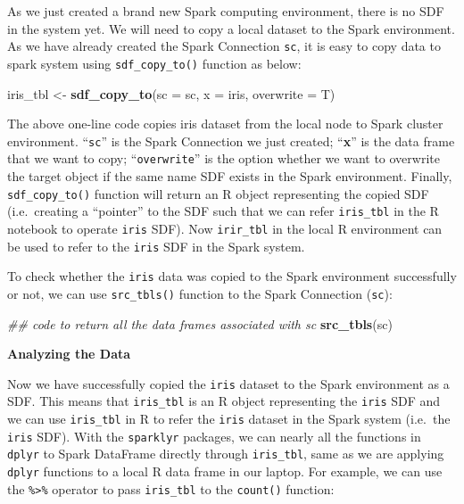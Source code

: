 \documentclass[12pt,]{krantz}
\makeatletter
\newenvironment{Shaded}{\begin{snugshade}}{\end{snugshade}}
\newcommand{\CommentTok}[1]{\textcolor[rgb]{0.37,0.37,0.37}{\textit{#1}}}
\newcommand{\DataTypeTok}[1]{\textcolor[rgb]{0.27,0.27,0.27}{#1}}
\newcommand{\KeywordTok}[1]{\textcolor[rgb]{0.27,0.27,0.27}{\textbf{#1}}}
\newcommand{\NormalTok}[1]{#1}
\newcommand{\StringTok}[1]{\textcolor[rgb]{0.5,0.5,0.5}{#1}}
\newenvironment{kframe}{%
\medskip{}
\setlength{\fboxsep}{.8em}
 \def\at@end@of@kframe{}%
 \ifinner\ifhmode%
  \def\at@end@of@kframe{\end{minipage}}%
  \begin{minipage}{\columnwidth}%
 \fi\fi%
 \def\FrameCommand##1{\hskip\@totalleftmargin \hskip-\fboxsep
 \colorbox{shadecolor}{##1}\hskip-\fboxsep
     \hskip-\linewidth \hskip-\@totalleftmargin \hskip\columnwidth}%
 \MakeFramed {\advance\hsize-\width
   \@totalleftmargin\z@ \linewidth\hsize
   \@setminipage}}%
 {\par\unskip\endMakeFramed%
 \at@end@of@kframe}
\renewenvironment{Shaded}{\begin{kframe}}{\end{kframe}}
\makeatother
\begin{document}
As we just created a brand new Spark computing environment, there is no SDF in the system yet. We will need to copy a local dataset to the Spark environment. As we have already created the Spark Connection \texttt{sc}, it is easy to copy data to spark system using \texttt{sdf\_copy\_to()} function as below:

\begin{Shaded}
\begin{Highlighting}[]
\NormalTok{iris_tbl <-}\StringTok{ }\KeywordTok{sdf_copy_to}\NormalTok{(}\DataTypeTok{sc =}\NormalTok{ sc, }\DataTypeTok{x =}\NormalTok{ iris, }\DataTypeTok{overwrite =}\NormalTok{ T)}
\end{Highlighting}
\end{Shaded}

The above one-line code copies iris dataset from the local node to Spark cluster environment. ``\texttt{sc}'' is the Spark Connection we just created; ``\textbf{x}'' is the data frame that we want to copy; ``\texttt{overwrite}'' is the option whether we want to overwrite the target object if the same name SDF exists in the Spark environment. Finally, \texttt{sdf\_copy\_to()} function will return an R object representing the copied SDF (i.e.~creating a ``pointer'' to the SDF such that we can refer \texttt{iris\_tbl} in the R notebook to operate \texttt{iris} SDF). Now \texttt{irir\_tbl} in the local R environment can be used to refer to the \texttt{iris} SDF in the Spark system.

To check whether the \texttt{iris} data was copied to the Spark environment successfully or not, we can use \texttt{src\_tbls()} function to the Spark Connection (\texttt{sc}):

\begin{Shaded}
\begin{Highlighting}[]
\CommentTok{## code to return all the data frames associated with sc}
\KeywordTok{src_tbls}\NormalTok{(sc) }
\end{Highlighting}
\end{Shaded}

\textbf{Analyzing the Data}

Now we have successfully copied the \texttt{iris} dataset to the Spark environment as a SDF. This means that \texttt{iris\_tbl} is an R object representing the \texttt{iris} SDF and we can use \texttt{iris\_tbl} in R to refer the \texttt{iris} dataset in the Spark system (i.e.~the \texttt{iris} SDF). With the \texttt{sparklyr} packages, we can nearly all the functions in \texttt{dplyr} to Spark DataFrame directly through \texttt{iris\_tbl}, same as we are applying \texttt{dplyr} functions to a local R data frame in our laptop. For example, we can use the \texttt{\%\textgreater{}\%} operator to pass \texttt{iris\_tbl} to the \texttt{count()} function:
\end{document}
